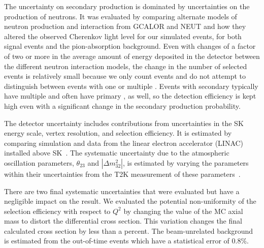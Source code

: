 \documentclass[
aps,
prd,
twocolumn,
superscriptaddress,
showpacs
]{revtex4-1}
\begin{document}
The uncertainty on secondary \gmr production is dominated by uncertainties on the production of neutrons.  It was evaluated by comparing alternate models of neutron production and interaction from GCALOR and NEUT and how they altered the observed Cherenkov light level for our simulated events, for both signal events and the pion-absorption background.  Even with changes of a factor of two or more in the average amount of energy deposited in the detector between the different neutron interaction models, the change in the number of selected events is relatively small because we only count events and do not attempt to distinguish between events with one or multiple \gmrs. Events with secondary \gmrs typically have multiple \gmrs and often have primary \gmrs, as well, so the detection efficiency is kept high even with a significant change in the secondary \gmr production probability.

The detector uncertainty includes contributions from uncertainties in the SK energy scale, vertex resolution, and selection efficiency.  It is estimated by comparing simulation and data from the linear electron accelerator (LINAC) installed above SK~\cite{Nakahata:1998pz}. The systematic uncertainty due to the atmospheric oscillation parameters, $\theta_{23}$ and $|\Delta m^{2}_{32}|$, is estimated by varying the parameters within their uncertainties from the T2K measurement of these parameters~\cite{Abe:2013fuq}.

There are two final systematic uncertainties that were evaluated but have a negligible impact on the result. We evaluated the potential non-uniformity of the selection efficiency with respect to $Q^2$ by changing the value of the MC axial mass to distort the differential cross section. This variation changes the final calculated cross section by less than a percent.
The beam-unrelated background is estimated from the out-of-time events which have a statistical error of $0.8\%$.
\end{document}

